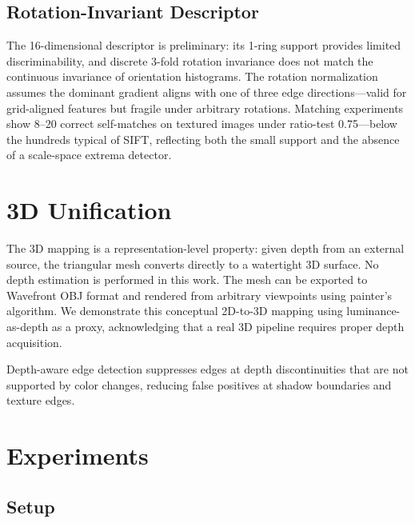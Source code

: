 \documentclass[10pt,twocolumn,letterpaper]{article}
\begin{document}
\subsection{Rotation-Invariant Descriptor}

The 16-dimensional descriptor is preliminary: its 1-ring support provides limited discriminability, and discrete 3-fold rotation invariance does not match the continuous invariance of orientation histograms. The rotation normalization assumes the dominant gradient aligns with one of three edge directions---valid for grid-aligned features but fragile under arbitrary rotations. Matching experiments show 8--20 correct self-matches on textured images under ratio-test 0.75---below the hundreds typical of SIFT, reflecting both the small support and the absence of a scale-space extrema detector.

\section{3D Unification}

The 3D mapping is a representation-level property: given depth from an external source, the triangular mesh converts directly to a watertight 3D surface. No depth estimation is performed in this work. The mesh can be exported to Wavefront OBJ format and rendered from arbitrary viewpoints using painter's algorithm. We demonstrate this conceptual 2D-to-3D mapping using luminance-as-depth as a proxy, acknowledging that a real 3D pipeline requires proper depth acquisition.

Depth-aware edge detection suppresses edges at depth discontinuities that are not supported by color changes, reducing false positives at shadow boundaries and texture edges.

\section{Experiments}

\subsection{Setup}
\end{document}
